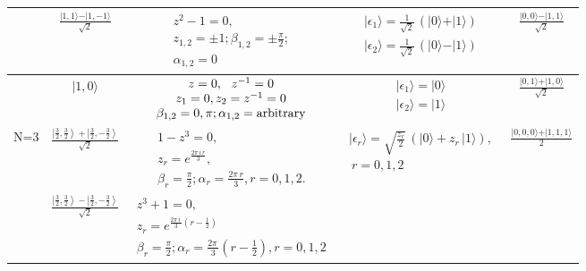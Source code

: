 \documentclass[pra,preprint,a4paper,superscriptaddress]{revtex4}
\begin{document}
{\begin{table}
{\begin{tabular}{|c c|c|c|c|}
\hline 
  & $\frac{\vert 1,1\rangle - \vert 1,-1\rangle}{\sqrt{2}}$
& $\begin{array}{c} z^2-1=0,\\ z_{1,2}=\pm 1; \beta_{1,2}=\pm \frac{\pi}{2}; \\ 
\alpha_{1,2}=0 \end{array}$ & $\begin{array}{c}\vert \epsilon_{1}\rangle=
  \frac{1}{\sqrt{2}}\, \left(\vert 0\rangle+ \vert 1\rangle\right)  \\ 
   \vert \epsilon_{2}\rangle=
  \frac{1}{\sqrt{2}}\, \left(\vert0\rangle- \vert 1\rangle\right)
  \end{array}$  & $\frac{\vert 0,0\rangle - \vert 1,1\rangle}{\sqrt{2}}$\\        
\hline 
 & $\vert 1,0\rangle $
& $\begin{array}{c} z=0,\ \ z^{-1}=0  \\
z_{1}=0, z_2=z^{-1}=0 \\  \beta_{1,2}=0, \pi; \alpha_{1,2}={\rm arbitrary}\end{array}$
 & $\begin{array}{c}\vert \epsilon_{1}\rangle=\vert0\rangle \\ 
\vert \epsilon_{2}\rangle=
  \vert1\rangle \end{array}$ & $\frac{\vert 0,1\rangle + \vert 1,0\rangle}{\sqrt{2}}$\\        
\hline 
N=3  &  $\frac{\left\vert \frac{3}{2},\frac{3}{2}\right\rangle
+\left\vert \frac{3}{2},-\frac{3}{2}\right\rangle}{\sqrt{2}}$
& $\begin{array}{c} 1- z^3=0, \\
z_{r}=e^{\frac{2\pi\, i\, r}{3}},   \\ 
\beta_{r}=\frac{\pi}{2}; \alpha_{r}=\frac{2\pi\, r}{3}, r=0,1,2.\end{array}$
& $\begin{array}{c}\vert \epsilon_{r}\rangle=
  \sqrt{\frac{z_r}{2}}\, \left(\vert 0\rangle+ z_r\, \vert 1\rangle\right),  \\ \ r=0,1,2\end{array}$
& $\frac{\vert 0,0,0\rangle+\vert 1,1,1\rangle}{2}$ \\
\hline 
  &  $\frac{\left\vert \frac{3}{2},\frac{3}{2}\right\rangle
-\left\vert \frac{3}{2},-\frac{3}{2}\right\rangle}{\sqrt{2}}$
& $\begin{array}{c}z^3+1=0, \\ 
z_{r}=e^{\frac{2\pi\, i\,}{3}(r-\frac{1}{2})} \\
\beta_{r}=\frac{\pi}{2}; \alpha_{r}=\frac{2\pi\, }{3}(r-\frac{1}{2}), r=0,1,2 \end{array}$

\end{tabular}}
\end{table}}
\end{document}
